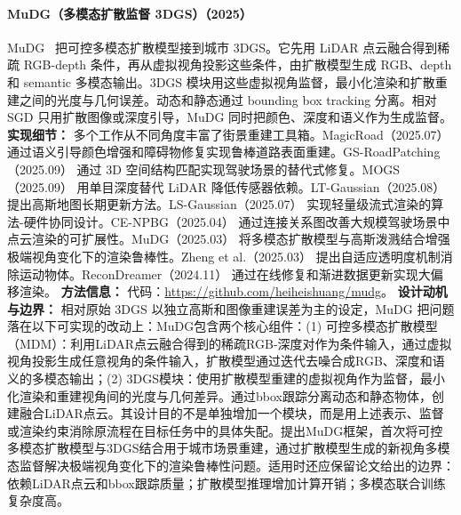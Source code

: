 \paragraph{MuDG（多模态扩散监督 3DGS）（2025）}
MuDG~\cite{2503_10604} 把可控多模态扩散模型接到城市 3DGS。它先用 LiDAR 点云融合得到稀疏 RGB-depth 条件，再从虚拟视角投影这些条件，由扩散模型生成 RGB、depth 和 semantic 多模态输出。3DGS 模块用这些虚拟视角监督，最小化渲染和扩散重建之间的光度与几何误差。动态和静态通过 bounding box tracking 分离。相对 SGD 只用扩散图像或深度引导，MuDG 同时把颜色、深度和语义作为生成监督。
\textbf{实现细节：} 多个工作从不同角度丰富了街景重建工具箱。MagicRoad（2025.07） 通过语义引导颜色增强和障碍物修复实现鲁棒道路表面重建。GS-RoadPatching（2025.09） 通过 3D 空间结构匹配实现驾驶场景的替代式修复。MOGS（2025.09） 用单目深度替代 LiDAR 降低传感器依赖。LT-Gaussian（2025.08） 提出高斯地图长期更新方法。LS-Gaussian（2025.07） 实现轻量级流式渲染的算法-硬件协同设计。CE-NPBG（2025.04） 通过连接关系图改善大规模驾驶场景中点云渲染的可扩展性。MuDG（2025.03） 将多模态扩散模型与高斯泼溅结合增强极端视角变化下的渲染鲁棒性。Zheng et al.（2025.03） 提出自适应透明度机制消除运动物体。ReconDreamer（2024.11） 通过在线修复和渐进数据更新实现大偏移渲染。
\textbf{方法信息：} 代码：\url{https://github.com/heiheishuang/mudg}。
\textbf{设计动机与边界：} 相对原始 3DGS 以独立高斯和图像重建误差为主的设定，MuDG 把问题落在以下可实现的改动上：MuDG包含两个核心组件：(1) 可控多模态扩散模型（MDM）：利用LiDAR点云融合得到的稀疏RGB-深度对作为条件输入，通过虚拟视角投影生成任意视角的条件输入，扩散模型通过迭代去噪合成RGB、深度和语义的多模态输出；(2) 3DGS模块：使用扩散模型重建的虚拟视角作为监督，最小化渲染和重建视角间的光度与几何差异。通过bbox跟踪分离动态和静态物体，创建融合LiDAR点云。其设计目的不是单独增加一个模块，而是用上述表示、监督或渲染约束消除原流程在目标任务中的具体失配。提出MuDG框架，首次将可控多模态扩散模型与3DGS结合用于城市场景重建，通过扩散模型生成的新视角多模态监督解决极端视角变化下的渲染鲁棒性问题。适用时还应保留论文给出的边界：依赖LiDAR点云和bbox跟踪质量；扩散模型推理增加计算开销；多模态联合训练复杂度高。
